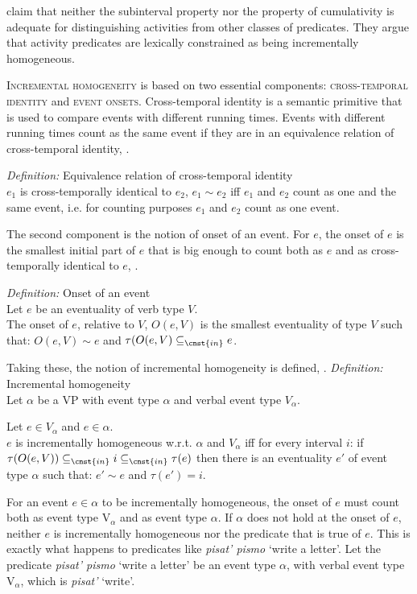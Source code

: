 \documentclass[output=paper,
]{langscibook}
\begin{document}
\citet{landman2010incremental,landman2012felicity} claim that neither the subinterval property nor the property of cumulativity is adequate for distinguishing activities from other classes of predicates. They argue that activity predicates are lexically constrained as being incrementally homogeneous.

\textsc{Incremental homogeneity} is based on two essential components: \textsc{cross-temporal identity} and \textsc{event onsets}. Cross-temporal identity is a semantic primitive that is used to compare events with different running times. Events with different running times count as the same event if they are in an equivalence relation of cross-temporal identity, .

\eanoraggedright \label{es28}
\textit{Definition:} Equivalence relation of cross-temporal identity\smallskip\\
$e_1$ is cross-temporally identical to $e_2$, $e_1 \sim e_2$ iff $e_1$ and $e_2$ count as one and the same event, i.e. for counting purposes $e_1$ and $e_2$ count as one event.
\z

\noindent The second component is the notion of onset of an event. For $e$, the onset of $e$ is the smallest initial part of $e$ that is big enough to count both as $e$ and as cross-temporally identical to $e$, .

\ea \label{ex:naumov:29}
\textit{Definition:} Onset of an event\smallskip\\
Let $e$ be an eventuality of verb type $V$. \\
The onset of $e$, relative to $V$, $O(e,V)$ is the smallest eventuality of type $V$ such that: $O(e,V) \sim e$ and $\tau(O(e,V) \subseteq_{\cnst{in}} e$.
\z

\noindent Taking these, the notion of incremental homogeneity is defined, .
\ea \label{ex:naumov:30}
\textit{Definition:} Incremental homogeneity\smallskip\\
Let $\alpha$ be a VP with event type $\alpha$ and verbal event type $V_\alpha$.

Let $e\in V_\alpha$ and $e \in \alpha$. \\
$e$ is incrementally homogeneous w.r.t. $\alpha$ and $V_\alpha$ iff for every interval $i$: if $\tau(O(e,V)) \subseteq_{\cnst{in}} i \subseteq_{\cnst{in}} \tau(e)$ then there is an eventuality $e'$ of event type $\alpha$ such that: $e' \sim e$ and $\tau(e') = i$.
\z

\noindent For an event $e \in \alpha$ to be incrementally homogeneous, the onset of $e$ must count both as event type V$_\alpha$ and as event type $\alpha$. If $\alpha$ does not hold at the onset of $e$, neither $e$ is incrementally homogeneous nor the predicate that is true of $e$. This is exactly what happens to predicates like \textit{pisat’ pismo} `write a letter’. Let the predicate \textit{pisat’ pismo} `write a letter’ be an event type $\alpha$, with verbal event type V$_\alpha$, which is \textit{pisat’} `write’.
\end{document}
